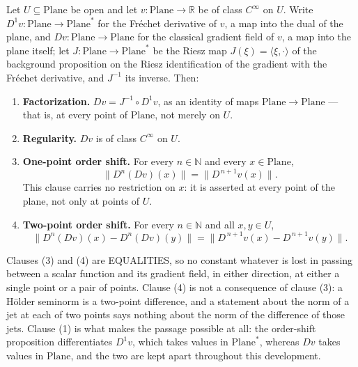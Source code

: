 \begin{lemma}
Let $U\subseteq\mathrm{Plane}$ be open and let $v\colon\mathrm{Plane}\to\mathbb{R}$ be of class
$C^{\infty}$ on $U$.  Write $D^{1}v\colon\mathrm{Plane}\to\mathrm{Plane}^{*}$ for the Fr\'echet
derivative of $v$, a map into the dual of the plane, and
$Dv\colon\mathrm{Plane}\to\mathrm{Plane}$ for the classical gradient field of $v$, a map into the
plane itself; let $J\colon\mathrm{Plane}\to\mathrm{Plane}^{*}$ be the Riesz map
$J(\xi)=\langle\xi,\cdot\rangle$ of the background proposition on the Riesz identification of the
gradient with the Fr\'echet derivative, and $J^{-1}$ its inverse.  Then:
\begin{enumerate}
\item[(1)] \textbf{Factorization.}  $Dv=J^{-1}\circ D^{1}v$, as an identity of maps
$\mathrm{Plane}\to\mathrm{Plane}$ --- that is, at every point of $\mathrm{Plane}$, not merely on
$U$.
\item[(2)] \textbf{Regularity.}  $Dv$ is of class $C^{\infty}$ on $U$.
\item[(3)] \textbf{One-point order shift.}  For every $n\in\mathbb{N}$ and every
$x\in\mathrm{Plane}$,
\[
  \bigl\lVert D^{n}(Dv)(x)\bigr\rVert=\bigl\lVert D^{\,n+1}v(x)\bigr\rVert .
\]
This clause carries no restriction on $x$: it is asserted at every point of the plane, not only
at points of $U$.
\item[(4)] \textbf{Two-point order shift.}  For every $n\in\mathbb{N}$ and all $x,y\in U$,
\[
  \bigl\lVert D^{n}(Dv)(x)-D^{n}(Dv)(y)\bigr\rVert
    =\bigl\lVert D^{\,n+1}v(x)-D^{\,n+1}v(y)\bigr\rVert .
\]
\end{enumerate}

Clauses (3) and (4) are EQUALITIES, so no constant whatever is lost in passing between a scalar
function and its gradient field, in either direction, at either a single point or a pair of
points.  Clause (4) is not a consequence of clause (3): a H\"older seminorm is a two-point
difference, and a statement about the norm of a jet at each of two points says nothing about the
norm of the difference of those jets.  Clause (1) is what makes the passage possible at all: the
order-shift proposition differentiates $D^{1}v$, which takes values in $\mathrm{Plane}^{*}$,
whereas $Dv$ takes values in $\mathrm{Plane}$, and the two are kept apart throughout this
development.
\end{lemma}
